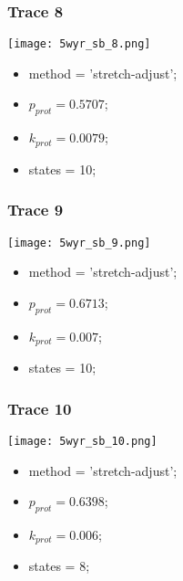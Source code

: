 \subsubsection{Trace 8}
\begin{minipage}[c]{0.7\textwidth}
    \texttt{[image: 5wyr\_sb\_8.png]}
\end{minipage}
\hfill
\begin{minipage}[c]{0.45\textwidth}
    \begin{itemize}
        \item method = 'stretch-adjust';
        \item $p_{prot}=0.5707$;
        \item $k_{prot}=0.0079$;
        \item states = 10;
    \end{itemize}
\end{minipage}

\subsubsection{Trace 9}
\begin{minipage}[c]{0.7\textwidth}
    \texttt{[image: 5wyr\_sb\_9.png]}
\end{minipage}
\hfill
\begin{minipage}[c]{0.45\textwidth}
    \begin{itemize}
        \item method = 'stretch-adjust';
        \item $p_{prot}=0.6713$;
        \item $k_{prot}=0.007$;
        \item states = 10;
    \end{itemize}
\end{minipage}

\subsubsection{Trace 10}
\begin{minipage}[c]{0.7\textwidth}
    \texttt{[image: 5wyr\_sb\_10.png]}
\end{minipage}
\hfill
\begin{minipage}[c]{0.45\textwidth}
    \begin{itemize}
        \item method = 'stretch-adjust';
        \item $p_{prot}=0.6398$;
        \item $k_{prot}=0.006$;
        \item states = 8;
    \end{itemize}
\end{minipage}

